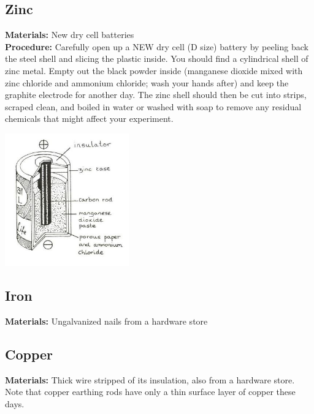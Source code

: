 \begin{multicols}{2}
\subsection{Zinc}
\vspace{-6pt}
\textbf{Materials:} New dry cell batteries\\
\textbf{Procedure:} Carefully open up a NEW dry cell (D size) battery by peeling back the steel shell and slicing the plastic inside. You should find a cylindrical shell of zinc metal. Empty out the black powder inside (manganese dioxide mixed with zinc chloride and ammonium chloride; wash your hands after) and keep the graphite electrode for another day. The zinc shell should then be cut into strips, scraped clean, and boiled in water or washed with soap to remove any residual chemicals that might affect your experiment.
\begin{center}
\includegraphics[width=0.4\textwidth]{./img/source/dry-cell.jpg}
\end{center}

\subsection{Iron}
\vspace{-6pt}
\textbf{Materials:} Ungalvanized nails from a hardware store
\subsection{Copper}
\vspace{-6pt}
\textbf{Materials:} Thick wire stripped of its insulation, also from a hardware store. Note that copper earthing rods have only a thin surface layer of copper these days.


\end{multicols}
